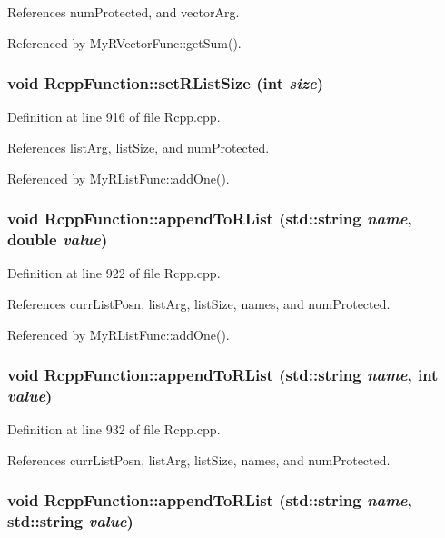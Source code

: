 References numProtected, and vectorArg.

Referenced by MyRVectorFunc::getSum().\hypertarget{classRcppFunction_f3dbcf8dcfbdfc49ef566b5efd0ad978}{
\subsubsection[setRListSize]{\setlength{\rightskip}{0pt plus 5cm}void RcppFunction::setRListSize (int {\em size})}}
\label{classRcppFunction_f3dbcf8dcfbdfc49ef566b5efd0ad978}




Definition at line 916 of file Rcpp.cpp.

References listArg, listSize, and numProtected.

Referenced by MyRListFunc::addOne().\hypertarget{classRcppFunction_0df1a8ff093e21a2a7c6fc80d6645c7e}{
\subsubsection[appendToRList]{\setlength{\rightskip}{0pt plus 5cm}void RcppFunction::appendToRList (std::string {\em name}, \/  double {\em value})}}
\label{classRcppFunction_0df1a8ff093e21a2a7c6fc80d6645c7e}




Definition at line 922 of file Rcpp.cpp.

References currListPosn, listArg, listSize, names, and numProtected.

Referenced by MyRListFunc::addOne().\hypertarget{classRcppFunction_fce449ac5d89b32e0e0b9f584278a672}{
\subsubsection[appendToRList]{\setlength{\rightskip}{0pt plus 5cm}void RcppFunction::appendToRList (std::string {\em name}, \/  int {\em value})}}
\label{classRcppFunction_fce449ac5d89b32e0e0b9f584278a672}




Definition at line 932 of file Rcpp.cpp.

References currListPosn, listArg, listSize, names, and numProtected.\hypertarget{classRcppFunction_861ba7ae5c09acf31a034472b5a47728}{
\subsubsection[appendToRList]{\setlength{\rightskip}{0pt plus 5cm}void RcppFunction::appendToRList (std::string {\em name}, \/  std::string {\em value})}}
\label{classRcppFunction_861ba7ae5c09acf31a034472b5a47728}





